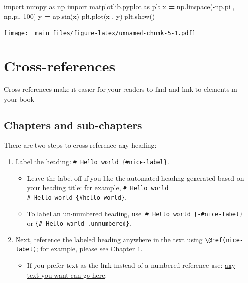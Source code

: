 \documentclass[
]{book}
\newenvironment{Shaded}{\begin{snugshade}}{\end{snugshade}}
\newcommand{\DecValTok}[1]{\textcolor[rgb]{0.00,0.00,0.81}{#1}}
\newcommand{\ImportTok}[1]{#1}
\newcommand{\NormalTok}[1]{#1}
\newcommand{\OperatorTok}[1]{\textcolor[rgb]{0.81,0.36,0.00}{\textbf{#1}}}
\providecommand{\tightlist}{%
  \setlength{\itemsep}{0pt}\setlength{\parskip}{0pt}}
\theoremstyle{definition}
\theoremstyle{definition}
\theoremstyle{definition}
\theoremstyle{definition}
\theoremstyle{remark}
\begin{document}
\begin{Shaded}
\begin{Highlighting}[]
\ImportTok{import}\NormalTok{ numpy }\ImportTok{as}\NormalTok{ np}
\ImportTok{import}\NormalTok{ matplotlib.pyplot }\ImportTok{as}\NormalTok{ plt}
\NormalTok{x }\OperatorTok{=}\NormalTok{ np.linspace(}\OperatorTok{{-}}\NormalTok{np.pi , np.pi, }\DecValTok{100}\NormalTok{)}
\NormalTok{y }\OperatorTok{=}\NormalTok{ np.sin(x)}
\NormalTok{plt.plot(x , y)}
\NormalTok{plt.show()}
\end{Highlighting}
\end{Shaded}

\texttt{[image: \_main\_files/figure-latex/unnamed-chunk-5-1.pdf]}

\hypertarget{cross}{%
\chapter{Cross-references}\label{cross}}

Cross-references make it easier for your readers to find and link to elements in your book.

\hypertarget{chapters-and-sub-chapters}{%
\section{Chapters and sub-chapters}\label{chapters-and-sub-chapters}}

There are two steps to cross-reference any heading:

\begin{enumerate}
\def\labelenumi{\arabic{enumi}.}
\tightlist
\item
  Label the heading: \texttt{\#\ Hello\ world\ \{\#nice-label\}}.

  \begin{itemize}
  \tightlist
  \item
    Leave the label off if you like the automated heading generated based on your heading title: for example, \texttt{\#\ Hello\ world} = \texttt{\#\ Hello\ world\ \{\#hello-world\}}.
  \item
    To label an un-numbered heading, use: \texttt{\#\ Hello\ world\ \{-\#nice-label\}} or \texttt{\{\#\ Hello\ world\ .unnumbered\}}.
  \end{itemize}
\item
  Next, reference the labeled heading anywhere in the text using \texttt{\textbackslash{}@ref(nice-label)}; for example, please see Chapter \ref{cross}.

  \begin{itemize}
  \tightlist
  \item
    If you prefer text as the link instead of a numbered reference use: \protect\hyperlink{cross}{any text you want can go here}.
  \end{itemize}
\end{enumerate}
\end{document}
